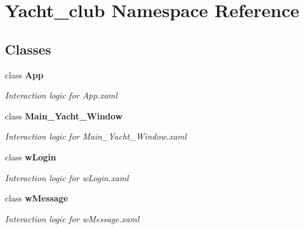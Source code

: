 \section{Yacht\+\_\+club Namespace Reference}
\label{namespace_yacht__club}
\subsection*{Classes}
\begin{DoxyCompactItemize}
\item 
class \textbf{ App}
\begin{DoxyCompactList}\small\item\em Interaction logic for App.\+xaml \end{DoxyCompactList}\item 
class \textbf{ Main\+\_\+\+Yacht\+\_\+\+Window}
\begin{DoxyCompactList}\small\item\em Interaction logic for Main\+\_\+\+Yacht\+\_\+\+Window.\+xaml \end{DoxyCompactList}\item 
class \textbf{ w\+Login}
\begin{DoxyCompactList}\small\item\em Interaction logic for w\+Login.\+xaml \end{DoxyCompactList}\item 
class \textbf{ w\+Message}
\begin{DoxyCompactList}\small\item\em Interaction logic for w\+Message.\+xaml \end{DoxyCompactList}\end{DoxyCompactItemize}
